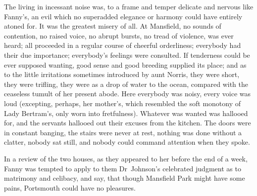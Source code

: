 The living in incessant noise was, to a frame and temper delicate and nervous like Fanny's, an evil which no superadded elegance or harmony could have entirely atoned for. It was the greatest misery of all. At Mansfield, no sounds of contention, no raised voice, no abrupt bursts, no tread of violence, was ever heard; all proceeded in a regular course of cheerful orderliness; everybody had their due importance; everybody's feelings were consulted. If tenderness could be ever supposed wanting, good sense and good breeding supplied its place; and as to the little irritations sometimes introduced by aunt Norris, they were short, they were trifling, they were as a drop of water to the ocean, compared with the ceaseless tumult of her present abode. Here everybody was noisy, every voice was loud (excepting, perhaps, her mother's, which resembled the soft monotony of Lady Bertram's, only worn into fretfulness). Whatever was wanted was hallooed for, and the servants hallooed out their excuses from the kitchen. The doors were in constant banging, the stairs were never at rest, nothing was done without a clatter, nobody sat still, and nobody could command attention when they spoke.

In a review of the two houses, as they appeared to her before the end of a week, Fanny was tempted to apply to them Dr~Johnson's celebrated judgment as to matrimony and celibacy, and say, that though Mansfield Park might have some pains, Portsmouth could have no pleasures. 